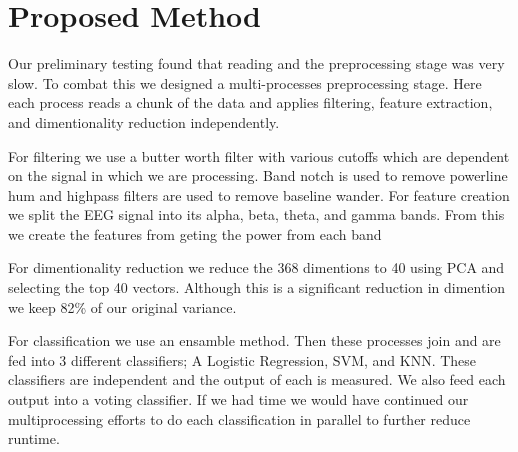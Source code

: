 \section{Proposed Method}
\label{sec:proposed_method}

Our preliminary testing found that reading and the preprocessing stage
was very slow.
To combat this we designed a multi-processes preprocessing stage.
Here each process reads a chunk of the data and applies filtering,
feature extraction, and dimentionality reduction independently.

For filtering we use a butter worth filter with various cutoffs which are dependent on the signal in which we are processing.
Band notch is used to remove powerline hum and highpass filters are used to remove
baseline wander.
For feature creation we split the EEG signal into its alpha, beta, theta, and gamma bands.
From this we create the features from geting the power from each band

For dimentionality reduction we reduce the 368 dimentions to 40 using PCA
and selecting the top 40 vectors.
Although this is a significant reduction in dimention we keep 82\% of our
original variance.

For classification we use an ensamble method.
Then these processes join and are fed into 3 different classifiers;
A Logistic Regression, SVM, and KNN.
These classifiers are independent and the output of each is measured.
We also feed each output into a voting classifier.
If we had time we would have continued our multiprocessing efforts to do each
classification in parallel to further reduce runtime.
